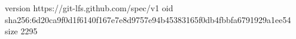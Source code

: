 version https://git-lfs.github.com/spec/v1
oid sha256:6d20ca9f0d1f6140f167e7e8d9757e94b45383165f0db4fbbfa6791929a1ee54
size 2295
